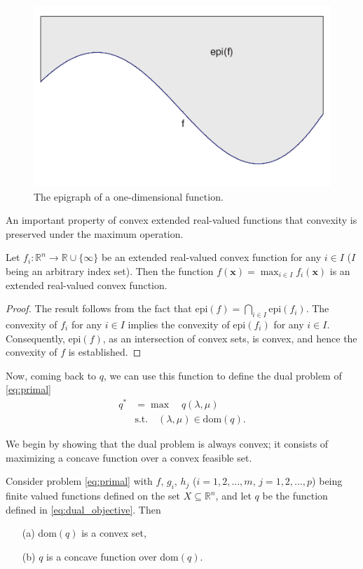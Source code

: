 \documentclass[10pt,a4paper]{article}
\begin{document}
\begin{figure}[h]
	\centering
	\includegraphics[width=0.5\linewidth]{epigraph}
	\caption{The epigraph of a one-dimensional function.}
	\label{fig:epigrph}
\end{figure}
\noindent An important property of convex extended real-valued functions that convexity is preserved under the maximum operation. 
\begin{theorem}\label{thm:max_is_convex}
	Let $f_i : \mathbb{R}^n \to \mathbb{R} \cup \{\infty\}$ be an extended real-valued convex function for any $i \in I$ ($I$ being an arbitrary index set). Then the function $f(\mathbf{x}) = \max_{i \in I} f_i(\mathbf{x})$ is an extended real-valued convex function.
\end{theorem}
\begin{proof}
	The result follows from the fact that $\text{epi}(f) = \bigcap_{i \in I} \text{epi}(f_i)$. The convexity of $f_i$ for any $i \in I$ implies the convexity of $\text{epi}(f_i)$ for any $i \in I$. Consequently, $\text{epi}(f)$, as an intersection of convex sets, is convex, and hence the convexity of $f$ is established. 
\end{proof}

\noindent Now, coming back to $q$, we can use this function to define the dual problem of \eqref{eq:primal}
\begin{equation}\label{eq:dual}
	\begin{aligned}
		q^* &= \max \quad q(\lambda, \mu) \\
		&\text{s.t.} \quad (\lambda, \mu) \in \text{dom}(q).
	\end{aligned}
\end{equation}

\noindent We begin by showing that the dual problem is always convex; it consists of maximizing a
concave function over a convex feasible set.

\begin{theorem}
	Consider problem \eqref{eq:primal} with $f$, $g_i$, $h_j$
	($i = 1, 2, \ldots, m$, $j = 1, 2, \ldots, p$) being finite valued functions defined on the set $X \subseteq \mathbb{R}^n$, and
	let $q$ be the function defined in \eqref{eq:dual_objective}. Then
	\begin{itemize}
		\item[(a)] dom$(q)$ is a convex set,
		\item[(b)] $q$ is a concave function over dom$(q)$.
	\end{itemize}
\end{theorem}
\end{document}
